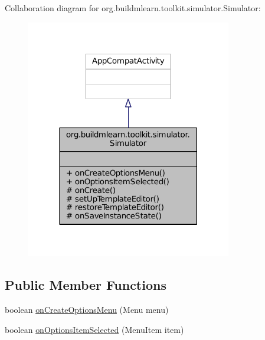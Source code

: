 Collaboration diagram for org.\-buildmlearn.\-toolkit.\-simulator.\-Simulator\-:
\nopagebreak
\begin{figure}[H]
\begin{center}
\leavevmode
\includegraphics[width=254pt]{d5/d64/classorg_1_1buildmlearn_1_1toolkit_1_1simulator_1_1Simulator__coll__graph}
\end{center}
\end{figure}
\subsection*{Public Member Functions}
\begin{DoxyCompactItemize}
\item 
boolean \hyperlink{classorg_1_1buildmlearn_1_1toolkit_1_1simulator_1_1Simulator_aa4b646ec6491ad85b3c96e35c6efcd6b}{on\-Create\-Options\-Menu} (Menu menu)
\item 
boolean \hyperlink{classorg_1_1buildmlearn_1_1toolkit_1_1simulator_1_1Simulator_aaa92074738110f36217c7fa33d920fb1}{on\-Options\-Item\-Selected} (Menu\-Item item)
\end{DoxyCompactItemize}
